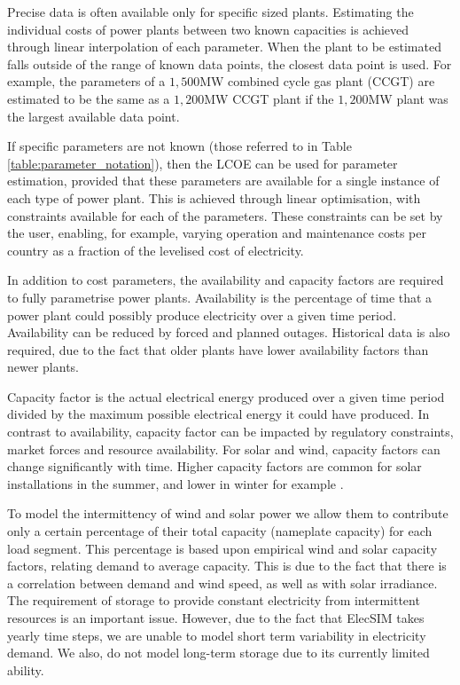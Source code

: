 Precise data is often available only for specific sized plants. Estimating the individual costs of power plants between two known capacities is achieved through linear interpolation of each parameter. When the plant to be estimated falls outside of the range of known data points, the closest data point is used. For example, the parameters of a $1,500$MW combined cycle gas plant (CCGT) are estimated to be the same as a $1,200$MW CCGT plant if the $1,200$MW plant was the largest available data point. 

If specific parameters are not known (those referred to in Table \ref{table:parameter_notation}), then the LCOE can be used for parameter estimation, provided that these parameters are available for a single instance of each type of power plant. This is achieved through linear optimisation, with constraints available for each of the parameters. These constraints can be set by the user, enabling, for example, varying operation and maintenance costs per country as a fraction of the levelised cost of electricity.


In addition to cost parameters, the availability and capacity factors are required to fully parametrise power plants. Availability is the percentage of time that a power plant could possibly produce electricity over a given time period. Availability can be reduced by forced and planned outages. Historical data is also required, due to the fact that older plants have lower availability factors than newer plants.

Capacity factor is the actual electrical energy produced over a given time period divided by the maximum possible electrical energy it could have produced. In contrast to availability, capacity factor can be impacted by regulatory constraints, market forces and resource availability. For solar and wind, capacity factors can change significantly with time. Higher capacity factors are common for solar installations in the summer, and lower in winter for example \cite{Stoft2002}. 

To model the intermittency of wind and solar power we allow them to contribute only a certain percentage of their total capacity (nameplate capacity) for each load segment. This percentage is based upon empirical wind and solar capacity factors, relating demand to average capacity. This is due to the fact that there is a correlation between demand and wind speed, as well as with solar irradiance. The requirement of storage to provide constant electricity from intermittent resources is an important issue. However, due to the fact that ElecSIM takes yearly time steps, we are unable to model short term variability in electricity demand. We also, do not model long-term storage due to its currently limited ability. 

